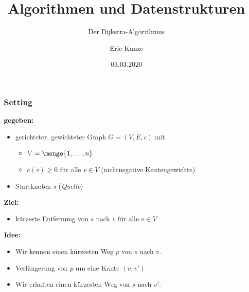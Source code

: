 \documentclass{beamer}
\newcommand{\person}[1]{\textsc{#1}}
\begin{document}
	
	\title{Algorithmen und Datenstrukturen}
	\subtitle{Der Dijkstra-Algorithmus}
	\author{Eric Kunze}
	\date{03.03.2020}

	\maketitle



\begin{frame} \frametitle{Setting \cite{vogler}}
	\textbf{gegeben:} 
	\begin{itemize}
		\item gerichteter, gewichteter Graph $G = (V,E,c)$ mit
		\begin{itemize}
			\item $V = \menge{1, \dots, n}$ 
			\item $c(v) \ge 0$ für alle $v \in V$ (nichtnegative Kantengewichte)
		\end{itemize}
		\item Startknoten $s$ (\textit{Quelle})
	\end{itemize}
	\textbf{Ziel:} 
		\begin{itemize}
			\item kürzeste Entfernung von $s$ nach $v$ für alle $v \in V$ 
		\end{itemize}
	\textbf{Idee:}
		\begin{itemize}
			\item Wir kennen einen kürzesten Weg $p$ von $s$ nach $v$.
			\item Verlängerung von $p$ um eine Kante $(v,v')$
			\item Wir erhalten einen kürzesten Weg von $s$ nach $v'$.
		\end{itemize}
\end{frame}
\end{document}
